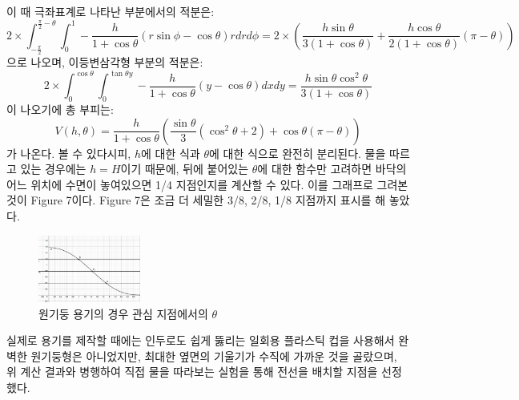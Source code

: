 \documentclass[a4paper,itemph]{oblivoir}
\theoremstyle{definition}
\begin{document}
이 때 극좌표계로 나타난 부분에서의 적분은:
\begin{equation}
    2\times\int_{-\frac{\pi}{2}}^{\frac{\pi}{2}-\theta}\int_{0}^{1}-\frac{h}{1+\cos{\theta}}(r\sin{\phi}-\cos{\theta})rdrd\phi = 2\times(\frac{h\sin{\theta}}{3(1+\cos{\theta})}+\frac{h\cos{\theta}}{2(1+\cos{\theta})}(\pi-\theta))
\end{equation}
으로 나오며, 이등변삼각형 부분의 적분은:
\begin{equation}
    2\times\int_{0}^{\cos{\theta}}\int_{0}^{\tan{\theta}y}-\frac{h}{1+\cos{\theta}}(y-\cos{\theta})dxdy = \frac{h\sin{\theta}\cos^2{\theta}}{3(1+\cos{\theta})}
\end{equation}
이 나오기에 총 부피는:
\begin{equation}
    V(h, \theta) = \frac{h}{1+\cos{\theta}}(\frac{\sin{\theta}}{3}(\cos^2{\theta}+2)+\cos{\theta}(\pi-\theta))
\end{equation}
가 나온다. 볼 수 있다시피, $h$에 대한 식과 $\theta$에 대한 식으로 완전히 분리된다. 물을 따르고 있는 경우에는 $h=H$이기 때문에, 뒤에 붙어있는 $\theta$에 대한 함수만 고려하면 바닥의 어느 위치에 수면이 놓여있으면 1/4 지점인지를 계산할 수 있다. 이를 그래프로 그려본 것이 Figure 7이다. Figure 7은 조금 더 세밀한 3/8, 2/8, 1/8 지점까지 표시를 해 놓았다.
\begin{figure}[h]
\centering
\includegraphics[width=0.3\textwidth]{graph.png}
\caption{원기둥 용기의 경우 관심 지점에서의 $\theta$}
\end{figure}

실제로 용기를 제작할 때에는 인두로도 쉽게 뚫리는 일회용 플라스틱 컵을 사용해서 완벽한 원기둥형은 아니었지만, 최대한 옆면의 기울기가 수직에 가까운 것을 골랐으며, 위 계산 결과와 병행하여 직접 물을 따라보는 실험을 통해 전선을 배치할 지점을 선정했다.
\end{document}
